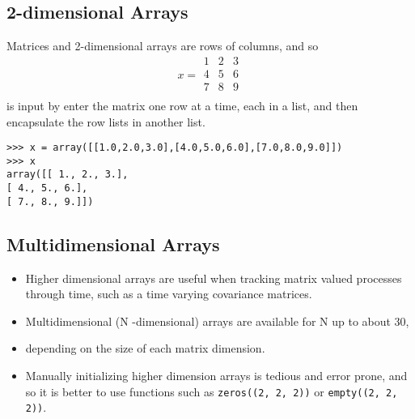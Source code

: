 \documentclass[Pydata.tex]{subfiles}
\begin{document}

\newpage
\subsection{2-dimensional Arrays}
Matrices and 2-dimensional arrays are rows of columns, and so
\[x =
\begin{array}{ccc}
1 & 2 & 3 \\
4 & 5 & 6 \\
7 & 8 & 9 \\
\end{array}
\]
is input by enter the matrix one row at a time, each in a list, and then encapsulate the row lists in another
list.
\begin{framed}
\begin{verbatim}
>>> x = array([[1.0,2.0,3.0],[4.0,5.0,6.0],[7.0,8.0,9.0]])
>>> x
array([[ 1., 2., 3.],
[ 4., 5., 6.],
[ 7., 8., 9.]])
\end{verbatim}
\end{framed}

\newpage
\subsection{Multidimensional Arrays}
\begin{itemize}
\item Higher dimensional arrays are useful when tracking matrix valued processes through time, such as a time varying
covariance matrices. 
\item Multidimensional (N -dimensional) arrays are available for N up to about 30,
\item depending on the size of each matrix dimension. 
\item Manually initializing higher dimension arrays is tedious
and error prone, and so it is better to use functions such as \texttt{zeros((2, 2, 2))} or \texttt{empty((2, 2, 2))}.
\end{itemize}

\end{document}
